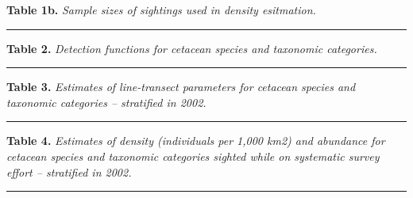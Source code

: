 \documentclass[
]{book}
\newenvironment{Shaded}{\begin{snugshade}}{\end{snugshade}}
\newcommand{\NormalTok}[1]{#1}
\newcommand{\OperatorTok}[1]{\textcolor[rgb]{0.81,0.36,0.00}{\textbf{#1}}}
\begin{document}
\textbf{Table 1b.} \emph{Sample sizes of sightings used in density esitmation.}

\begin{Shaded}
\end{Shaded}

\begin{center}\rule{0.5\linewidth}{0.5pt}\end{center}

\textbf{Table 2.} \emph{Detection functions for cetacean species and taxonomic categories.}

\begin{Shaded}
\end{Shaded}

\begin{center}\rule{0.5\linewidth}{0.5pt}\end{center}

\textbf{Table 3.} \emph{Estimates of line-transect parameters for cetacean species and taxonomic categories -- stratified in 2002.}

\begin{Shaded}
\end{Shaded}

\begin{center}\rule{0.5\linewidth}{0.5pt}\end{center}

\textbf{Table 4.} \emph{Estimates of density (individuals per 1,000 km2) and abundance for cetacean species and taxonomic categories sighted while on systematic survey effort -- stratified in 2002.}

\begin{Shaded}
\end{Shaded}

\begin{center}\rule{0.5\linewidth}{0.5pt}\end{center}
\end{document}

